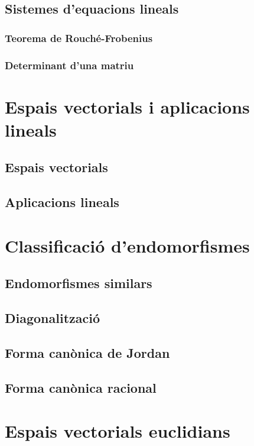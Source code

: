 \documentclass[../Apunts.tex]{subfiles}
\begin{document}
\section{Sistemes d'equacions lineals}
\subsection{Teorema de Rouché-Frobenius}
\subsection{Determinant d'una matriu}

\chapter{Espais vectorials i aplicacions lineals}
\section{Espais vectorials}

\section{Aplicacions lineals}

\chapter{Classificació d'endomorfismes}
\section{Endomorfismes similars}
\section{Diagonalització}
\section{Forma canònica de Jordan}
\section{Forma canònica racional}

\chapter{Espais vectorials euclidians}
\end{document}
